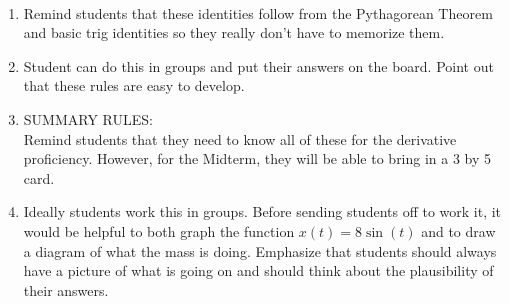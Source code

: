 \documentclass[11pt,fleqn]{article}
\begin{document}
\renewcommand{\headrulewidth}{0pt}
\newcommand{\blank}[1]{\rule{#1}{0.75pt}}
\newcommand{\bc}{\begin{center}}
\newcommand{\ec}{\end{center}}
\renewcommand{\d}{\displaystyle}

\vspace*{-0.7in}

\begin{center}
  \large
  \\
\end{center}
\begin{enumerate}

\item Remind students that these identities follow from the Pythagorean Theorem and basic trig identities so they really don't have to memorize them.\\

\item Student can do this in groups and put their answers on the board. Point out that these rules are easy to develop. 
\item SUMMARY RULES:\\

Remind students that they need to know all of these for the derivative proficiency. However, for the Midterm, they will be able to bring in a 3 by 5 card.
\item Ideally students work this in groups. Before sending students off to work it, it would be helpful to both graph the function $x(t)=8\sin(t)$ and to draw a diagram of what the mass is doing. Emphasize that students should always have a picture of what is going on and should think about the plausibility of their answers.
\end{enumerate}
\end{document}

